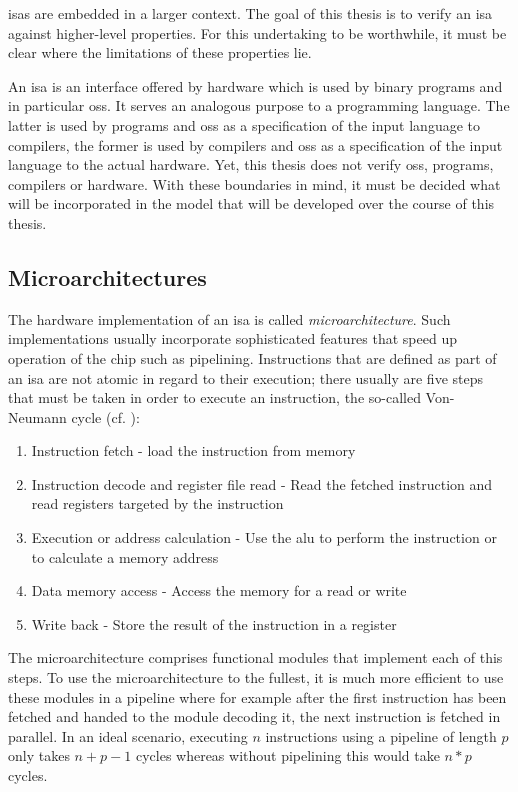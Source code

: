 \glspl{isa} are embedded in a larger context.
The goal of this thesis is to verify an \gls{isa} against higher-level properties.
For this undertaking to be worthwhile, it must be clear where the limitations of these properties lie.

An \gls{isa} is an interface offered by hardware which is used by binary programs and in particular \glspl{os}.
It serves an analogous purpose to a programming language.
The latter is used by programs and \glspl{os} as a specification of the input language to compilers, the former is used by compilers and \glspl{os} as a specification of the input language to the actual hardware.
Yet, this thesis does not verify \glspl{os}, programs, compilers or hardware.
With these boundaries in mind, it must be decided what will be incorporated in the model that will be developed over the course of this thesis.

\subsection{Microarchitectures}
\label{sec:microarchs}

The hardware implementation of an \gls{isa} is called \textit{microarchitecture}.
Such implementations usually incorporate sophisticated features that speed up operation of the chip such as pipelining.
Instructions that are defined as part of an \gls{isa} are not atomic in regard to their execution; there usually are five steps that must be taken in order to execute an instruction, the so-called Von-Neumann cycle (cf. \cite[p.286]{Patterson13}):
\begin{enumerate}
    \item Instruction fetch - load the instruction from memory
    \item Instruction decode and register file read - Read the fetched instruction and read registers targeted by the instruction
    \item Execution or address calculation - Use the \gls{alu} to perform the instruction or to calculate a memory address
    \item Data memory access - Access the memory for a read or write
    \item Write back - Store the result of the instruction in a register
\end{enumerate}
The microarchitecture comprises functional modules that implement each of this steps.
To use the microarchitecture to the fullest, it is much more efficient to use these modules in a pipeline where for example after the first instruction has been fetched and handed to the module decoding it, the next instruction is fetched in parallel.
In an ideal scenario, executing $ n $ instructions using a pipeline of length $ p $ only takes $ n + p - 1 $ cycles whereas without pipelining this would take $ n * p $ cycles.

